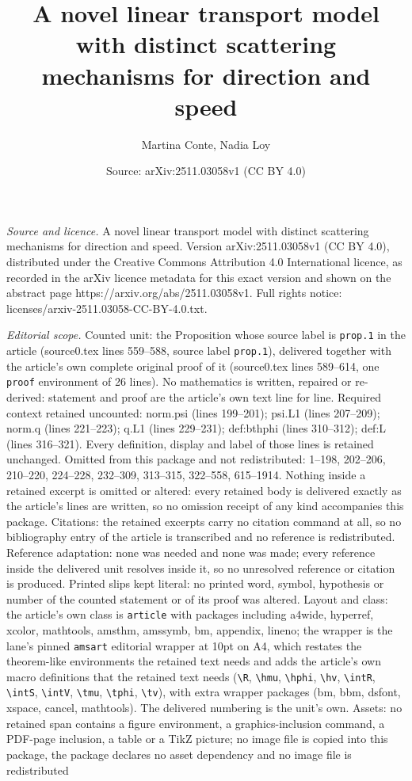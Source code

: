 \documentclass[10pt,a4paper]{amsart}
\title[A novel linear transport model with distinct scattering mech]{A novel linear transport model with distinct scattering mechanisms for direction and speed}
\author{Martina Conte, Nadia Loy}
\date{Source: arXiv:2511.03058v1 (CC BY 4.0)}
\begin{document}
\maketitle

\noindent\emph{Source and licence.} A novel linear transport model with distinct scattering mechanisms for direction and speed. Version arXiv:2511.03058v1 (CC BY 4.0), distributed under the Creative Commons Attribution 4.0 International licence, as recorded in the arXiv licence metadata for this exact version and shown on the abstract page https://arxiv.org/abs/2511.03058v1. Full rights notice: licenses/arxiv-2511.03058-CC-BY-4.0.txt.\par\smallskip

\noindent\textit{Editorial scope.} Counted unit: the Proposition whose source label is \texttt{prop.1} in the article (source0.tex lines 559--588, source label \texttt{prop.1}), delivered together with the article's own complete original proof of it (source0.tex lines 589--614, one \texttt{proof} environment of 26 lines). No mathematics is written, repaired or re-derived: statement and proof are the article's own text line for line. Required context retained uncounted: norm.psi (lines 199--201); psi.L1 (lines 207--209); norm.q (lines 221--223); q.L1 (lines 229--231); def:bthphi (lines 310--312); def:L (lines 316--321). Every definition, display and label of those lines is retained unchanged. Omitted from this package and not redistributed: 1--198, 202--206, 210--220, 224--228, 232--309, 313--315, 322--558, 615--1914. Nothing inside a retained excerpt is omitted or altered: every retained body is delivered exactly as the article's lines are written, so no omission receipt of any kind accompanies this package. Citations: the retained excerpts carry no citation command at all, so no bibliography entry of the article is transcribed and no reference is redistributed. Reference adaptation: none was needed and none was made; every reference inside the delivered unit resolves inside it, so no unresolved reference or citation is produced. Printed slips kept literal: no printed word, symbol, hypothesis or number of the counted statement or of its proof was altered. Layout and class: the article's own class is \texttt{article} with packages including a4wide, hyperref, xcolor, mathtools, amsthm, amssymb, bm, appendix, lineno; the wrapper is the lane's pinned \texttt{amsart} editorial wrapper at 10pt on A4, which restates the theorem-like environments the retained text needs and adds the article's own macro definitions that the retained text needs (\texttt{\textbackslash R}, \texttt{\textbackslash hmu}, \texttt{\textbackslash hphi}, \texttt{\textbackslash hv}, \texttt{\textbackslash intR}, \texttt{\textbackslash intS}, \texttt{\textbackslash intV}, \texttt{\textbackslash tmu}, \texttt{\textbackslash tphi}, \texttt{\textbackslash tv}), with extra wrapper packages (bm, bbm, dsfont, xspace, cancel, mathtools). The delivered numbering is the unit's own. Assets: no retained span contains a figure environment, a graphics-inclusion command, a PDF-page inclusion, a table or a TikZ picture; no image file is copied into this package, the package declares no asset dependency and no image file is redistributed 
\end{document}
